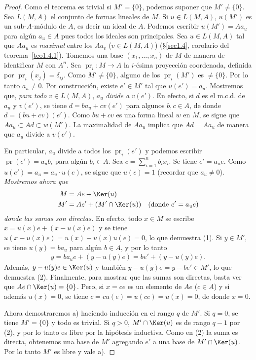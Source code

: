 \documentclass[oneside,bibtotoc,leqno,spanish]{amsbook}
\renewcommand{\to}[1][]{\xrightarrow{#1}}
\DeclareMathOperator{\pr}{pr}
\numberwithin{equation}{section}
\theoremstyle{defi}
\theoremstyle{note}
\theoremstyle{rem}
\numberwithin{theorem}{section}
\numberwithin{proposition}{section}
\numberwithin{definition}{section}
\numberwithin{lemma}{section}
\numberwithin{corollary}{section}
\numberwithin{example}{section}
\numberwithin{footnote}{section}%
\begin{document}
\begin{proof}
Como el teorema es trivial si $M' = \{0\}$, podemos suponer que $M' \neq \{0\}$.
Sea $L(M,A)$ el conjunto de formas lineales de $M$. Si $u\in L(M,A)$, $u(M')$
es un sub-$A$-m\'odulo de $A$, es decir un ideal de $A$. Podemos escribir $u(M') = Aa_{u}$
para alg\'un $a_{u}\in A$ pues todos los ideales son principales. Sea $u\in L(M,A)$
tal que $Aa_{u}$ es {\em maximal} entre los $Aa_{v}$ ($v\in L(M,A)$) (\S\ref{sec1.4},
corolario del teorema~\ref{teo1.4.1}).
Tomemos una base $(x_{1},\dots,x_{n})$ de $M$ de manera de identificar
$M$ con $A^{n}$. Sea $\pr_{i}:M\to A$ la $i$-\'esima proyecci\'on coordenada, definida
por $\pr_{i}(x_{j}) = \delta_{ij}$. Como $M'\neq\{0\}$, alguno de los $\pr_{i}(M')$ es
$\neq\{0\}$. Por lo tanto $a_{u}\neq 0$. Por construcci\'on, existe $e'\in M'$ tal que
$u(e') = a_{u}$. Mostremos que, {\em para todo} $v\in L(M,A)$, $a_{u}$ {\em divide a} $v(e')$.
En efecto, si $d$ es el m.c.d. de $a_{u}$ y $v(e')$, se tiene $d = ba_{u}+cv(e')$ para
algunos $b,c\in A$, de donde $d = (bu+cv)(e')$. Como $bu+cv$ es una forma lineal $w$ en $M$,
se sigue que $Aa_{u}\subset Ad\subset w(M')$. La maximalidad de $Aa_{u}$ implica que
$Ad = Aa_{u}$ de manera que $a_{u}$ divide a $v(e')$.

En particular, $a_{u}$ divide a todos los $\pr_{i}(e')$ y podemos escribir $\pr(e') = a_{u}b_{i}$
para alg\'un
$b_{i}\in A$. Sea $c = \sum_{i=1}^{n}b_{i}x_{i}$. Se tiene $e' = a_{u}e$. Como
$u(e') = a_{u} = a_{u}\cdot u(e)$, se sigue que $u(e) = 1$ (recordar que $a_{u}\neq 0$).
{\itshape Mostremos ahora que
\begin{align}
M &= Ae+\Ker(u)\\
M' &= Ae'+(M'\cap \Ker(u))\quad(\text{donde $e' = a_{u}e$})
\end{align}
donde las sumas son directas.} En efecto, todo $x\in M$ se escribe $x = u(x)e+(x-u(x)e)$
y se tiene $u(x-u(x)e) = u(x) - u(x)u(e) = 0$, lo que demuestra (1). Si $y\in M'$, se
tiene $u(y) = ba_{u}$ para alg\'un $b\in A$, y por lo tanto
\begin{gather*}
y = ba_{u}e + (y-u(y)e) = be'+(y-u(y)e).
\end{gather*}
Adem\'as, $y-u(y)e\in\Ker(u)$ y tambi\'en $y-u(y)e = y-be'\in M'$, lo que demuestra (2).
Finalmente, para mostrar que las sumas son directas, basta ver que $Ae\cap\Ker(u) = \{0\}$.
Pero, si $x = ce$ es un elemento de $Ae$ ($c\in A$) y si adem\'as $u(x) = 0$, se tiene $c = cu(e) = u(ce)
= u(x) = 0$, de donde $x = 0$.

Ahora demostraremos a) haciendo inducci\'on en el rango $q$ de $M'$. Si $q = 0$, se tiene
$M' = \{0\}$ y todo es trivial. Si $q > 0$, $M'\cap\Ker(u)$ es de rango $q-1$ por (2), y por lo
tanto es libre por la hip\'otesis inductiva. Como en (2) la suma es directa, obtenemos una
base de $M'$ agregando $e'$ a una base de $M'\cap\Ker(u)$. Por lo tanto $M'$ es libre y vale a).


\end{proof}
\end{document}
